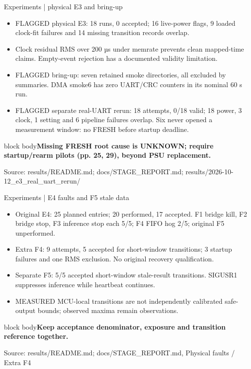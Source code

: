 \documentclass[aspectratio=169,12pt,t]{beamer}
\newcommand{\src}[1]{\par\vfill{\small\color{muted}Source: #1}}
\newcommand{\takeaway}[1]{\par\medskip\begin{beamercolorbox}[sep=2mm,wd=\linewidth]{block body}\color{navy}\textbf{#1}\end{beamercolorbox}}
\begin{document}
\begin{frame}{Experiments | physical E3 and bring-up}
\begin{itemize}
\item FLAGGED physical E3: 18 runs, 0 accepted; 16 live-power flags, 9 loaded clock-fit failures and 14 missing transition records overlap.
\item Clock residual RMS over 200 µs under memrate prevents clean mapped-time claims. Empty-event rejection has a documented validity limitation.
\item FLAGGED bring-up: seven retained smoke directories, all excluded by summaries. DMA smoke6 has zero UART/CRC counters in its nominal 60 s run.
\item FLAGGED separate real-UART rerun: 18 attempts, 0/18 valid; 18 power, 3 clock, 1 setting and 6 pipeline failures overlap. Six never opened a measurement window: no FRESH before startup deadline.
\end{itemize}
\takeaway{Missing FRESH root cause is UNKNOWN; require startup/rearm pilots (pp. 25, 29), beyond PSU replacement.}\src{results/README.md; docs/STAGE\_REPORT.md; results/2026-10-12\_e3\_real\_uart\_rerun/}
\end{frame}
\begin{frame}{Experiments | E4 faults and F5 stale data}
\begin{itemize}
\item Original E4: 25 planned entries; 20 performed, 17 accepted. F1 bridge kill, F2 bridge stop, F3 inference stop each 5/5; F4 FIFO hog 2/5; original F5 unperformed.
\item Extra F4: 9 attempts, 5 accepted for short-window transitions; 3 startup failures and one RMS exclusion. No original recovery qualification.
\item Separate F5: 5/5 accepted short-window stale-result transitions. SIGUSR1 suppresses inference while heartbeat continues.
\item MEASURED MCU-local transitions are not independently calibrated safe-output bounds; observed maxima remain observations.
\end{itemize}
\takeaway{Keep acceptance denominator, exposure and transition reference together.}\src{results/README.md; docs/STAGE\_REPORT.md, Physical faults / Extra F4}
\end{frame}
\end{document}

